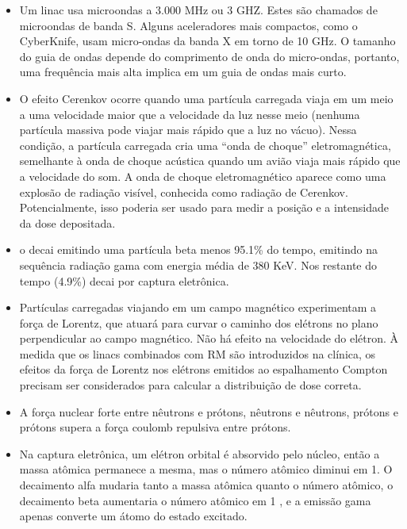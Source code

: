 \documentclass[11pt,a4paper]{article}
\newcounter{exemplo}
\begin{document}
\begin{exemplo}[Física]
\begin{itemize}
        \item Um linac usa microondas a 3.000 MHz ou 3 GHZ. Estes são chamados de microondas de banda S. Alguns aceleradores mais compactos, como o CyberKnife, usam micro-ondas da banda X em torno de 10 GHz. O tamanho do guia de ondas depende do comprimento de onda do micro-ondas, portanto, uma frequência mais alta implica em um guia de ondas mais curto.
        
        \item O efeito Cerenkov ocorre quando uma partícula carregada viaja em um meio a uma velocidade maior que a velocidade da luz nesse meio (nenhuma partícula massiva pode viajar mais rápido que a luz no vácuo). Nessa condição, a partícula carregada cria uma “onda de choque” eletromagnética, semelhante à onda de choque acústica quando um avião viaja mais rápido que a velocidade do som. A onda de choque eletromagnético aparece como uma explosão de radiação visível, conhecida como radiação de Cerenkov. Potencialmente, isso poderia ser usado para medir a posição e a intensidade da dose depositada.
        
        \item o  decai emitindo uma partícula beta menos 95.1\% do tempo, emitindo na sequência radiação gama com energia média de 380 KeV. Nos restante do tempo (4.9\%) decai por captura eletrônica.
        
        \item Partículas carregadas viajando em um campo magnético experimentam a força de Lorentz, que atuará para curvar o caminho dos elétrons no plano perpendicular ao campo magnético. Não há efeito na velocidade do elétron. À medida que os linacs combinados com RM são introduzidos na clínica, os efeitos da força de Lorentz nos elétrons emitidos ao espalhamento Compton precisam ser considerados para calcular a distribuição de dose correta.
        
        \item A força nuclear forte entre nêutrons e prótons, nêutrons e nêutrons, prótons e prótons supera a força coulomb repulsiva entre prótons. 
        
        \item Na captura eletrônica, um elétron orbital é absorvido pelo núcleo, então a massa atômica permanece a mesma, mas o número atômico diminui em 1. O decaimento alfa mudaria tanto a massa atômica quanto o número atômico, o decaimento beta aumentaria o número atômico em 1 , e a emissão gama apenas converte um átomo do estado excitado.
        

\end{itemize}
\end{exemplo}
\end{document}
